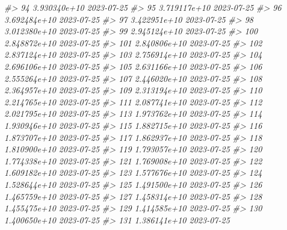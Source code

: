 \documentclass[
  xelatex, ja=standard]{bxjsbook}
\newenvironment{Shaded}{\begin{snugshade}}{\end{snugshade}}
\newcommand{\CommentTok}[1]{\textcolor[rgb]{0.56,0.35,0.01}{\textit{#1}}}
\theoremstyle{definition}
\theoremstyle{definition}
\theoremstyle{definition}
\theoremstyle{definition}
\theoremstyle{remark}
\begin{document}
\begin{Shaded}
\begin{Highlighting}[]
\CommentTok{\#\textgreater{} 94  3.930340e+10         2023{-}07{-}25}
\CommentTok{\#\textgreater{} 95  3.719117e+10         2023{-}07{-}25}
\CommentTok{\#\textgreater{} 96  3.692484e+10         2023{-}07{-}25}
\CommentTok{\#\textgreater{} 97  3.422951e+10         2023{-}07{-}25}
\CommentTok{\#\textgreater{} 98  3.012380e+10         2023{-}07{-}25}
\CommentTok{\#\textgreater{} 99  2.945124e+10         2023{-}07{-}25}
\CommentTok{\#\textgreater{} 100 2.848872e+10         2023{-}07{-}25}
\CommentTok{\#\textgreater{} 101 2.840806e+10         2023{-}07{-}25}
\CommentTok{\#\textgreater{} 102 2.837124e+10         2023{-}07{-}25}
\CommentTok{\#\textgreater{} 103 2.756914e+10         2023{-}07{-}25}
\CommentTok{\#\textgreater{} 104 2.696106e+10         2023{-}07{-}25}
\CommentTok{\#\textgreater{} 105 2.631166e+10         2023{-}07{-}25}
\CommentTok{\#\textgreater{} 106 2.555264e+10         2023{-}07{-}25}
\CommentTok{\#\textgreater{} 107 2.446020e+10         2023{-}07{-}25}
\CommentTok{\#\textgreater{} 108 2.364957e+10         2023{-}07{-}25}
\CommentTok{\#\textgreater{} 109 2.313194e+10         2023{-}07{-}25}
\CommentTok{\#\textgreater{} 110 2.214765e+10         2023{-}07{-}25}
\CommentTok{\#\textgreater{} 111 2.087741e+10         2023{-}07{-}25}
\CommentTok{\#\textgreater{} 112 2.021795e+10         2023{-}07{-}25}
\CommentTok{\#\textgreater{} 113 1.973762e+10         2023{-}07{-}25}
\CommentTok{\#\textgreater{} 114 1.930946e+10         2023{-}07{-}25}
\CommentTok{\#\textgreater{} 115 1.882715e+10         2023{-}07{-}25}
\CommentTok{\#\textgreater{} 116 1.873707e+10         2023{-}07{-}25}
\CommentTok{\#\textgreater{} 117 1.862937e+10         2023{-}07{-}25}
\CommentTok{\#\textgreater{} 118 1.810900e+10         2023{-}07{-}25}
\CommentTok{\#\textgreater{} 119 1.793057e+10         2023{-}07{-}25}
\CommentTok{\#\textgreater{} 120 1.774338e+10         2023{-}07{-}25}
\CommentTok{\#\textgreater{} 121 1.769008e+10         2023{-}07{-}25}
\CommentTok{\#\textgreater{} 122 1.609182e+10         2023{-}07{-}25}
\CommentTok{\#\textgreater{} 123 1.577676e+10         2023{-}07{-}25}
\CommentTok{\#\textgreater{} 124 1.528644e+10         2023{-}07{-}25}
\CommentTok{\#\textgreater{} 125 1.491500e+10         2023{-}07{-}25}
\CommentTok{\#\textgreater{} 126 1.465759e+10         2023{-}07{-}25}
\CommentTok{\#\textgreater{} 127 1.458314e+10         2023{-}07{-}25}
\CommentTok{\#\textgreater{} 128 1.455475e+10         2023{-}07{-}25}
\CommentTok{\#\textgreater{} 129 1.414585e+10         2023{-}07{-}25}
\CommentTok{\#\textgreater{} 130 1.400650e+10         2023{-}07{-}25}
\CommentTok{\#\textgreater{} 131 1.386141e+10         2023{-}07{-}25}

\end{Highlighting}
\end{Shaded}
\end{document}
